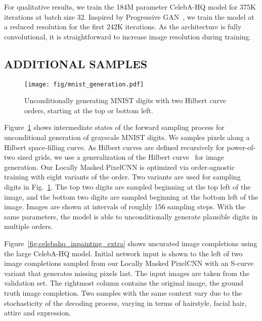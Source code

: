 \documentclass[letterpaper]{article}
\begin{document}
For qualitative results, we train the 184\textsc{M} parameter  CelebA-HQ model for 375\textsc{K} iterations at batch size 32. Inspired by Progressive GAN~\citep{karras2018progressive}, we train the model at a reduced  resolution for the first 242\textsc{K} iterations. As the architecture is fully convolutional, it is straightforward to increase image resolution during training.

\subsection{ADDITIONAL SAMPLES}

\begin{figure}
    \centering
    \texttt{[image: fig/mnist\_generation.pdf]}
    \vspace{-6mm}
    \caption{Unconditionally generating MNIST digits with two Hilbert curve orders, starting at the top or bottom left.}
    \label{fig:mnist_generation}
\end{figure}

Figure~\ref{fig:mnist_generation} shows intermediate states of the forward sampling process for unconditional generation of grayscale MNIST digits. We samples pixels along a Hilbert space-filling curve. As Hilbert curves are defined recursively for power-of-two sized grids, we use a generalization of the Hilbert curve~\citep{gilbert} for  image generation. Our Locally Masked PixelCNN is optimized via order-agnostic training with eight variants of the order. Two variants are used for sampling digits in Fig.~\ref{fig:mnist_generation}. The top two digits are sampled beginning at the top left of the image, and the bottom two digits are sampled beginning at the bottom left of the image. Images are shown at intervals of roughly 156 sampling steps. With the same parameters, the model is able to unconditionally generate plausible digits in multiple orders.

Figure~\ref{fig:celebahq_inpainting_extra} shows uncurated image completions using the large CelebA-HQ model. Initial network input is shown to the left of two image completions sampled from our Locally Masked PixelCNN with an S-curve variant that generates missing pixels last. The input images are taken from the validation set. The rightmost column contains the original image, \ie{} the ground truth image completion. Two samples with the same context vary due to the stochasticity of the decoding process, \eg{} varying in terms of hairstyle, facial hair, attire and expression.
\end{document}
